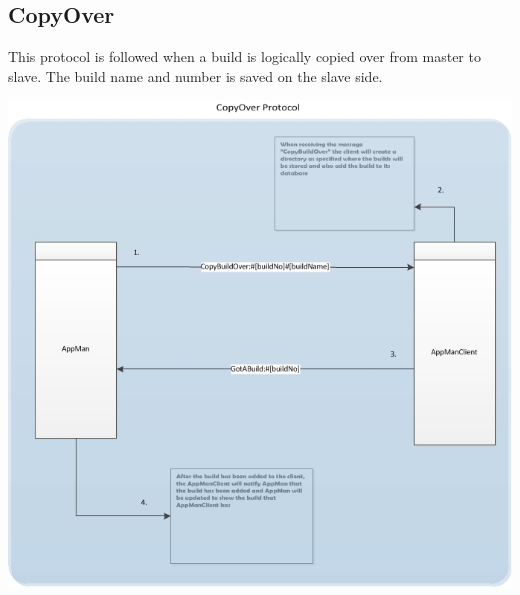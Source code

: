 \documentclass[a4paper,12pt,final]{article}
\begin{document}
\subsection{CopyOver}
This protocol is followed when a build is logically copied over from master to slave. The build name and number is saved on the slave side. 
\begin{center}
\includegraphics[scale=0.85]{CommunicationProtocol/CopyOverProtocol.jpg} 
\end{center}





\end{document}
